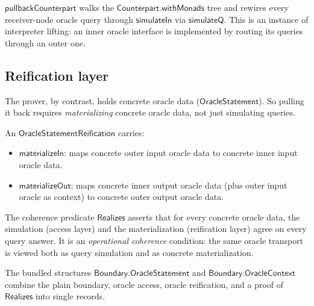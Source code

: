 $\mathsf{pullbackCounterpart}$ walks the
$\mathsf{Counterpart.withMonads}$ tree and rewires every receiver-node
oracle query through $\mathsf{simulateIn}$ via $\mathsf{simulateQ}$.  This is
an instance of interpreter lifting: an inner oracle interface is implemented by
routing its queries through an outer one.

\subsection{Reification layer}

The prover, by contrast, holds concrete oracle data ($\mathsf{OracleStatement}$).
So pulling it back requires \emph{materializing} concrete oracle data, not just
simulating queries.

\begin{definition}[OracleStatementReification]
  \label{int:oracle-statement-reification}
  An $\mathsf{OracleStatementReification}$ carries:
  \begin{itemize}
    \item $\mathsf{materializeIn}$: maps concrete outer input oracle data to
      concrete inner input oracle data.
    \item $\mathsf{materializeOut}$: maps concrete inner output oracle data
      (plus outer input oracle as context) to concrete outer output oracle data.
  \end{itemize}
\end{definition}

\begin{definition}[Realizes]
  \label{int:realizes}
  The coherence predicate $\mathsf{Realizes}$ asserts that for every concrete
  oracle data, the simulation (access layer) and the materialization
  (reification layer) agree on every query answer.  It is an
  \emph{operational coherence} condition: the same oracle transport is viewed
  both as query simulation and as concrete materialization.
\end{definition}

The bundled structures $\mathsf{Boundary.OracleStatement}$ and
$\mathsf{Boundary.OracleContext}$ combine the plain boundary, oracle access,
oracle reification, and a proof of $\mathsf{Realizes}$ into single records.

